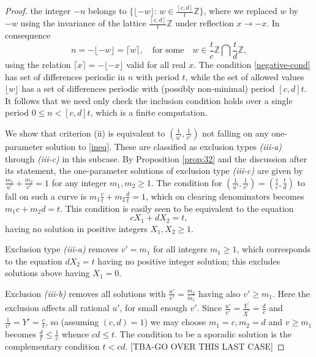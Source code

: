 \documentclass[12pt,letterpaper, reqno]{amsart}
\theoremstyle{definition}
\theoremstyle{remark}
\newcommand{\ZZ}{\ensuremath{\mathbb{Z}}}
\newcommand{\uu}{{u'}}
\newcommand{\vv}{{v'}}
\begin{document}
\begin{proof}
the integer $-n$ belongs to
$ \{ \lfloor -w \rfloor: \, w \in \frac{[c,d]}{t} \ZZ \}$, where we replaced $w$ by $-w$ 
using the invariance of the lattice  $\frac{[c,d]}{t} \ZZ$  under reflection $x \to -x$. In consequence
\[
n = - \lfloor -w \rfloor = \lceil w \rceil,   \quad  \mbox{for some} \quad w \in \frac{t}c \ZZ \bigcap \frac{t}d \ZZ ,
\]
using the relation $\lceil x \rceil = - \lfloor -x \rfloor$ valid for all real $x$.
The condition \eqref{negative-cond} has set of differences  periodic in
$n$ with period $t$, while the set of allowed values $\lfloor w \rfloor$
 has a set of differences periodic with (possibly non-minimal) period $[c,d] t$. 
It follows that  we need only check the inclusion condition holds over a single period $0 \le n < [c,d]t $,
which is a finite computation.


We show that criterion (ii) is equivalent to $(\frac{1}{\uu}, \frac1{\vv})$ not falling on any one-parameter solution to \eqref{ineq}.
These are classified as exclusion types {\it (iii-a)} through {\it (iii-c)} in this subcase. 
By Proposition \ref{prop:32} and the discussion after its statement,
the  one-parameter solutions of exclusion type {\it (iii-c)}  are  given by $\frac{m_1}{{\uu}} + \frac{m_2}{{\vv}} =1$
for any integer $m_1, m_2 \ge 1$. 
  The  condition for $(\frac{1}{\uu}, \frac1\vv) = (\frac{t}{c}, \frac{t}{d})$ 
 to fall on such a curve 
is  $m_1 \frac{c}{t}  + m_2 \frac{d}{t}= 1$, which on clearing denominators becomes 
 $m_1 c + m_2 d= t$. This condition is easily seen to be equivalent to the equation 
$$
cX_1 + dX_2 = t,
$$
having no solution in positive integers $X_1, X_2 \ge 1$. 

Exclusion type {\it (iii-a)} removes $\vv= m_1$ for all integers $m_1 \ge 1$, which corresponds to 
the equation $d X_2= t$
having no positive integer solution; this excludes solutions above having $X_1=0$. 

Exclusion {\it (iii-b)}  removes all solutions
with $\frac\uu\vv = \frac{m_2}{m_1}$ having also   $\vv \geq {m_1}.$ 
Here the exclusion affects all rational $\uu$, for small enough $\vv$.  
Since  $\frac\uu\vv = \frac{Y^{'}}{X^{'}}=\frac{d}{c}$
and $\frac1\vv=Y'= \frac{c}{t}$, so (assuming $(c, d)=1$) we may choose $m_1=c, m_2=d$ and
$ v \geq {m_1}$ becomes $\frac{d}{t} \le \frac{1}{c}$ whence $cd \le t$. 
The condition to be a sporadic solution is  the complementary condition  $t < cd$.
[TBA-GO OVER THIS LAST CASE]



\end{proof}
\end{document}

